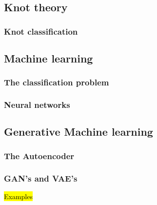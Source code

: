 
\subsection{Knot theory}
\subsubsection{Knot classification}

\subsection{Machine learning}
\subsubsection{The classification problem}
\subsubsection{Neural networks}

\subsection{Generative Machine learning}
\subsubsection{The Autoencoder}
\subsubsection{GAN's and VAE's}
\hl{Examples}